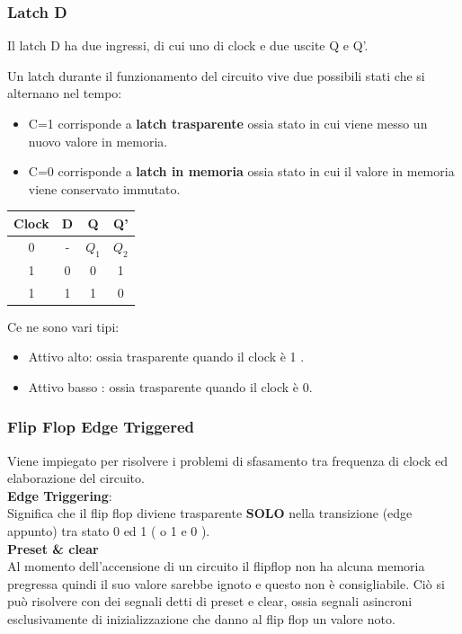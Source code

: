 \documentclass[a4paper]{book}
\begin{document}
\subsubsection{Latch D}

Il latch D ha due ingressi, di cui uno di clock e due uscite Q e Q'.

Un latch durante il funzionamento del circuito vive due possibili stati che si alternano nel tempo:

\begin{itemize}
\item C=1 corrisponde a \textbf{latch trasparente} ossia stato in cui viene messo un nuovo valore in memoria.
\item C=0 corrisponde a \textbf{latch in memoria} ossia stato in cui il valore in memoria viene conservato immutato.
\end{itemize}	


\begin{tabular}{|c|c|c|c|}
\hline
Clock & D & Q   & Q' \\
\hline
0     & - & \(Q_1\) & \(Q_2\)\\
\hline
1     & 0 & 0   & 1  \\
\hline
1     & 1 & 1   & 0  \\
\hline
\end{tabular}



Ce ne sono vari tipi:

\begin{itemize}
\item{Attivo alto}: ossia trasparente quando il clock è 1 .
\item{Attivo basso} : ossia trasparente quando il clock è 0.
\end{itemize}



\subsubsection{Flip Flop Edge Triggered} 

Viene impiegato per risolvere i problemi di sfasamento tra frequenza di clock ed elaborazione del circuito.\vspace{\baselineskip}\\
\textbf{Edge Triggering}:\\
Significa che il flip flop diviene trasparente \textbf{SOLO} nella transizione (edge appunto) tra stato 0 ed 1 ( o 1 e 0 ).\vspace{\baselineskip}\\
\textbf{Preset \& clear}\\
Al momento dell'accensione di un circuito il flipflop non ha alcuna memoria pregressa quindi il suo valore sarebbe ignoto e questo non è consigliabile.
Ciò si può risolvere con dei segnali detti di preset e clear, ossia segnali asincroni esclusivamente di inizializzazione che danno al flip flop un valore noto.\\
\end{document}
